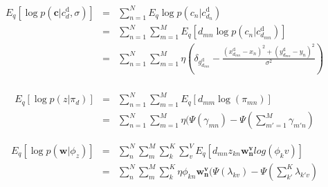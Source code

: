 \documentclass[]{article}
\begin{document}
\begin{eqnarray}
E_q [\log p(\boldsymbol{c} | c^{\mathrm{d}}_d, \sigma)] 
&=& \sum\limits_{n=1}^{N} E_q \log p(c_n | c_{d_n}^{\mathrm{d}}) \\
&=& \sum\limits_{n=1}^{N} \sum\limits_{m=1}^{M} E_q [d_{mn} \log p(c_n | c_{d_{mn}}^{\mathrm{d}})]  \\
&=& \sum\limits_{n=1}^{N} \sum\limits_{m=1}^{M} \eta (\delta_{g_{d_{mn}}^{\mathrm{d}}} - \frac{(x_{d_{mn}}^{\mathrm{d}} - x_n)^2 + (y_{d_{mn}}^{\mathrm{d}} - y_n)^2}{\sigma^2})\\
\end{eqnarray}

\begin{eqnarray}
E_q[\log p(z | \pi_d)]
&=& \sum\limits_{n=1}^{N} \sum\limits_{m=1}^{M} E_q[d_{mm} \log(\pi_{mn})] \\
&=& \sum\limits_{n=1}^{N} \sum\limits_{m=1}^{M} \eta (\Psi(\gamma_{mn}) - \Psi(\sum\limits_{m'=1}^{M} \gamma_{m'n})
\end{eqnarray}

\begin{eqnarray}
E_q [\log p(\boldsymbol{w} | \phi_z)]
&=& \sum\limits_{n}^{N} \sum\limits_{m}^{M} \sum\limits_{k}^{K} \sum\limits_{v}^{V} E_q[d_{mn} z_{kn} \boldsymbol{w_n^v} log(\phi_kv)] \\
&=& \sum\limits_{n}^{N} \sum\limits_{m}^{M} \sum\limits_{k}^{K} \eta \phi_{kn} \boldsymbol{w_n^v} (\Psi(\lambda_{kv}) - \Psi(\sum\limits_{k'}^{K} \lambda_{k'v}) \\
\end{eqnarray}
\end{document}
